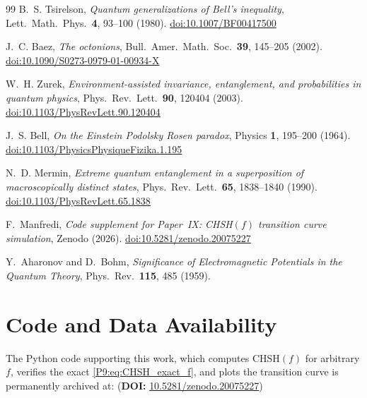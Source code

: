 \documentclass[11pt,a4paper]{article}
\theoremstyle{definition}
\theoremstyle{remark}
\begin{document}
\begin{thebibliography}{99}
B.~S. Tsirelson,
\textit{Quantum generalizations of Bell's inequality},
Lett.\ Math.\ Phys.\ \textbf{4}, 93--100 (1980).
\href{https://doi.org/10.1007/BF00417500}{doi:10.1007/BF00417500}
 
J.~C. Baez,
\textit{The octonions},
Bull.\ Amer.\ Math.\ Soc.\ \textbf{39}, 145--205 (2002).
\href{https://doi.org/10.1090/S0273-0979-01-00934-X}{doi:10.1090/S0273-0979-01-00934-X}
 
W.~H. Zurek,
\textit{Environment-assisted invariance, entanglement, and probabilities in quantum physics},
Phys.\ Rev.\ Lett.\ \textbf{90}, 120404 (2003).
\href{https://doi.org/10.1103/PhysRevLett.90.120404}{doi:10.1103/PhysRevLett.90.120404}
 
J.~S. Bell,
\textit{On the Einstein Podolsky Rosen paradox},
Physics \textbf{1}, 195--200 (1964).
\href{https://doi.org/10.1103/PhysicsPhysiqueFizika.1.195}{doi:10.1103/PhysicsPhysiqueFizika.1.195}
 
N.~D. Mermin,
\textit{Extreme quantum entanglement in a superposition of macroscopically
distinct states},
Phys.\ Rev.\ Lett.\ \textbf{65}, 1838--1840 (1990).
\href{https://doi.org/10.1103/PhysRevLett.65.1838}{doi:10.1103/PhysRevLett.65.1838}
 
F.~Manfredi,
\textit{Code supplement for Paper~IX: CHSH$(f)$ transition curve simulation},
Zenodo (2026).
\href{https://doi.org/10.5281/zenodo.20075227}{doi:10.5281/zenodo.20075227}
 
Y.~Aharonov and D.~Bohm,
\textit{Significance of Electromagnetic Potentials in the Quantum Theory},
Phys.\ Rev.\ \textbf{115}, 485 (1959).

\end{thebibliography}
\appendix
\section{Code and Data Availability}
 
The Python code supporting this work, which computes CHSH$(f)$ for arbitrary $f$, verifies the exact \eqref{P9:eq:CHSH_exact_f}, and plots the
transition curve is permanently archived at: \cite{Code_P9} (\textbf{DOI:} \href{https://doi.org/10.5281/zenodo.20075227}{10.5281/zenodo.20075227})
 
\end{document}
